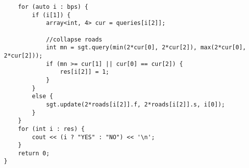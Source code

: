 \documentclass[15pt]{article}
\begin{document}
\begin{lstlisting}
	for (auto i : bps) {
		if (i[1]) {
			array<int, 4> cur = queries[i[2]];

			//collapse roads
			int mn = sgt.query(min(2*cur[0], 2*cur[2]), max(2*cur[0], 2*cur[2]));
			if (mn >= cur[1] || cur[0] == cur[2]) {
				res[i[2]] = 1;
			}
		}
		else {
			sgt.update(2*roads[i[2]].f, 2*roads[i[2]].s, i[0]);
		}
	}
	for (int i : res) {
		cout << (i ? "YES" : "NO") << '\n';
	}
	return 0;
}
\end{lstlisting}
\end{document}
